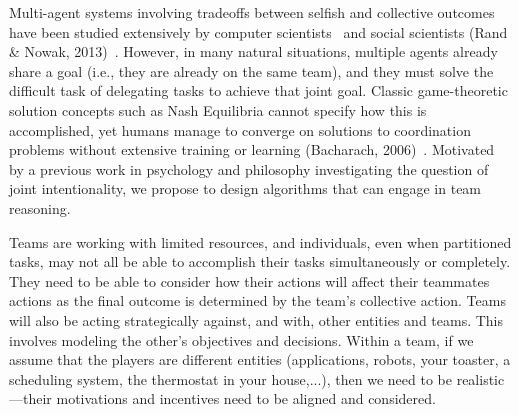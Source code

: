 
Multi-agent systems involving tradeoffs between selfish and collective
outcomes have been studied extensively by computer
scientists~\cite{claus1998dynamics} and social scientists (Rand \&
Nowak, 2013)~\cite{rand2013human}.  However, in many natural
situations, multiple agents already share a goal (i.e., they are
already on the same team), and they must solve the difficult task of
delegating tasks to achieve that joint goal.  Classic game-theoretic
solution concepts such as Nash Equilibria cannot specify how this is
accomplished, yet humans manage to converge on solutions to
coordination problems without extensive training or learning
(Bacharach, 2006)~\cite{bacharach2006beyond}.  Motivated by a previous
work in psychology and philosophy investigating the question of joint
intentionality, we propose to design algorithms that can engage in
team reasoning.


Teams are working with limited resources, and individuals, even when
partitioned tasks, may not all be able to accomplish their tasks
simultaneously or completely. They need to be able to consider how
their actions will affect their teammates actions as the final outcome
is determined by the team's collective action. Teams will also be
acting strategically against, and with, other entities and teams. This
involves modeling the other's objectives and decisions. Within a team,
if we assume that the players are different entities (applications,
robots, your toaster, a scheduling system, the thermostat in your
house,...), then we need to be realistic---their motivations and
incentives need to be aligned and considered.


